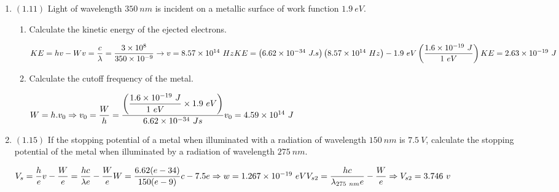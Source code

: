 \documentclass[fleqn]{article}
\begin{document}
  \begin{enumerate}
    \item $(\mathbf{1.11})$ Light of wavelength $350 ~ nm$ is incident on a metallic surface of work function $1.9 ~ eV$.
      \begin{enumerate}
        \item Calculate the kinetic energy of the ejected electrons.

          \textcolor{hwColor}{
            $
              KE=hv-W \\
              \\
              v=\dfrac{c}{\lambda}=\dfrac{3 \times 10^8}{350 \times 10^{-9}} \rightarrow v=8.57 \times 10^{14} ~ Hz \\
              \\
              KE=\left(6.62 \times 10^{-34} ~ J.s\right)\left(8.57 \times 10^{14} ~ Hz\right)-1.9 ~ eV\left(\dfrac{1.6 \times 10^{-19} ~ J}{1 ~ eV}\right) \\
              \\
              KE=2.63 \times 10^{-19} ~ J
            $
          }

        \item Calculate the cutoff frequency of the metal.

          \textcolor{hwColor}{
            $
              W=h.v_0 \Rightarrow v_0=\dfrac{W}{h}=\dfrac{\left(\dfrac{1.6 \times 10^{-19} ~ J}{1 ~ eV} \times 1.9 ~ eV\right)}{6.62 \times 10^{-34} ~ Js} \\
              \\
              v_0=4.59 \times 10^{14} ~ J
            $
          }

      \end{enumerate}

    \item $(\mathbf{1.15})$ If the stopping potential of a metal when illuminated with a radiation of wavelength $150 ~ nm$ is $7.5 ~ V$, 
    calculate the stopping potential of the metal when illuminated by a radiation of wavelength $275 ~ nm$.

      \textcolor{hwColor}{
        $
          V_s=\dfrac{h}{e}v-\dfrac{W}{e}=\dfrac{hc}{\lambda e}-\dfrac{W}{e} \\
          \\
          W=\dfrac{6.62(e-34)}{150(e-9)}c-7.5e \Rightarrow w=1.267 \times 10^{-19} ~ eV \\
          \\
          \\
          V_{s2}=\dfrac{hc}{\lambda_{275 ~ nm}e}-\dfrac{W}{e} \Rightarrow V_{s2}=3.746 ~ v
        $
      }


\end{enumerate}
\end{document}
